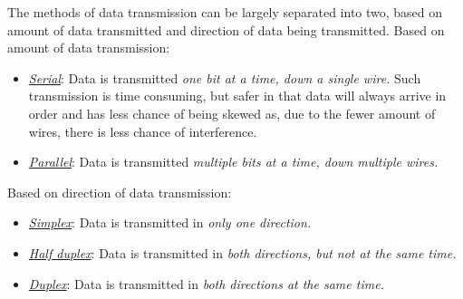 The methods of data transmission can be largely separated
into two, based on amount of data transmitted and
direction of data being transmitted.
Based on amount of data transmission:
\begin{itemize}
	\item \ul{\emph{Serial}}: Data is transmitted \emph{one
		bit	at a time, down a single wire.} Such 
		transmission is time consuming, but safer in that
		data will always arrive in order and has less chance
		of being skewed as, due to the fewer amount of wires,
		there is less chance of interference.
	\item \ul{\emph{Parallel}}: Data is transmitted \emph{
		multiple bits at a time, down multiple wires.}
\end{itemize}
Based on direction of data transmission:
\begin{itemize}
	\item \ul{\emph{Simplex}}: Data is transmitted in 
		\emph{only one direction.}
	\item \ul{\emph{Half duplex}}: Data is transmitted in
		\emph{both directions, but not at the same time.}
	\item \ul{\emph{Duplex}}: Data is transmitted in 
		\emph{both directions at the same time.}
\end{itemize}
